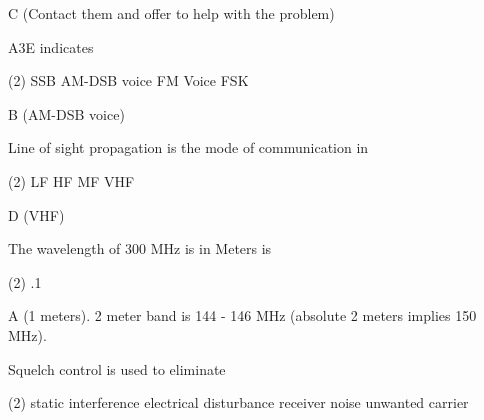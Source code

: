 \documentclass[a4paper]{article}
\begin{document}
\begin{solution}
	C (Contact them and offer to help with the problem)
\end{solution}

\vspace{5mm}



\begin{question}A3E indicates
	\begin{tasks}(2)
		\task SSB
		\task AM-DSB voice
		\task FM Voice
		\task FSK
	\end{tasks}
\end{question}

\begin{solution}
	B (AM-DSB voice)
\end{solution}

\vspace{5mm}



\begin{question}Line of sight propagation is the mode of communication in
	\begin{tasks}(2)
		\task LF
		\task HF
		\task MF
		\task VHF
	\end{tasks}
\end{question}

\begin{solution}
	D (VHF)
\end{solution}

\vspace{5mm}



\begin{question}The wavelength of 300 MHz is in Meters is
	\begin{tasks}(2)
		\task .1
	\end{tasks}
\end{question}

\begin{solution}
	A (1 meters). 2 meter band is 144 - 146 MHz (absolute 2 meters implies 150 MHz).
\end{solution}

\vspace{5mm}



\begin{question}Squelch control is used to eliminate
	\begin{tasks}(2)
		\task static interference
		\task electrical disturbance
		\task receiver noise
		\task unwanted carrier
	\end{tasks}
\end{question}
\end{document}
